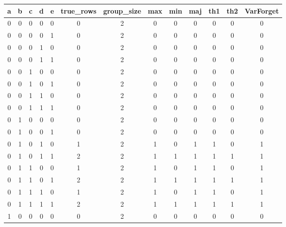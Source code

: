 \begin{table}[!tb]
    \centering
    \begin{tabular}{|c|c|c|c|c|c|c|c|c|c|c|c|c|}
        \hline
        \textbf{a} & \textbf{b} & \textbf{c} & \textbf{d} & \textbf{e} & \textbf{true\_rows} & \textbf{group\_size} & \textbf{max} & \textbf{min} & \textbf{maj} & \textbf{th1} & \textbf{th2} & \textbf{VarForget} \\ \hline
        \rowcolor{gray!40} 0 & 0 & 0 & 0 & 0 & 0 & 2 & 0 & 0 & 0 & 0 & 0 & 0 \\ \hline
        \rowcolor{blue!40} 0 & 0 & 0 & 0 & 1 & 0 & 2 & 0 & 0 & 0 & 0 & 0 & 0 \\ \hline
        \rowcolor{red!40} 0 & 0 & 0 & 1 & 0 & 0 & 2 & 0 & 0 & 0 & 0 & 0 & 0 \\ \hline
        \rowcolor{green!40} 0 & 0 & 0 & 1 & 1 & 0 & 2 & 0 & 0 & 0 & 0 & 0 & 0 \\ \hline
        \rowcolor{yellow!40} 0 & 0 & 1 & 0 & 0 & 0 & 2 & 0 & 0 & 0 & 0 & 0 & 0 \\ \hline
        \rowcolor{gray!40} 0 & 0 & 1 & 0 & 1 & 0 & 2 & 0 & 0 & 0 & 0 & 0 & 0 \\ \hline
        \rowcolor{blue!40} 0 & 0 & 1 & 1 & 0 & 0 & 2 & 0 & 0 & 0 & 0 & 0 & 0 \\ \hline
        \rowcolor{red!40} 0 & 0 & 1 & 1 & 1 & 0 & 2 & 0 & 0 & 0 & 0 & 0 & 0 \\ \hline
        \rowcolor{green!40} 0 & 1 & 0 & 0 & 0 & 0 & 2 & 0 & 0 & 0 & 0 & 0 & 0 \\ \hline
        \rowcolor{yellow!40} 0 & 1 & 0 & 0 & 1 & 0 & 2 & 0 & 0 & 0 & 0 & 0 & 0 \\ \hline
        \rowcolor{gray!40} 0 & 1 & 0 & 1 & 0 & 1 & 2 & 1 & 0 & 1 & 1 & 0 & 1 \\ \hline
        \rowcolor{blue!40} 0 & 1 & 0 & 1 & 1 & 2 & 2 & 1 & 1 & 1 & 1 & 1 & 1 \\ \hline
        \rowcolor{red!40} 0 & 1 & 1 & 0 & 0 & 1 & 2 & 1 & 0 & 1 & 1 & 0 & 1 \\ \hline
        \rowcolor{green!40} 0 & 1 & 1 & 0 & 1 & 2 & 2 & 1 & 1 & 1 & 1 & 1 & 1 \\ \hline
        \rowcolor{yellow!40} 0 & 1 & 1 & 1 & 0 & 1 & 2 & 1 & 0 & 1 & 1 & 0 & 1 \\ \hline
        \rowcolor{gray!40} 0 & 1 & 1 & 1 & 1 & 2 & 2 & 1 & 1 & 1 & 1 & 1 & 1 \\ \hline
        \rowcolor{blue!40} 1 & 0 & 0 & 0 & 0 & 0 & 2 & 0 & 0 & 0 & 0 & 0 & 0 \\ \hline

\end{tabular}
\end{table}
